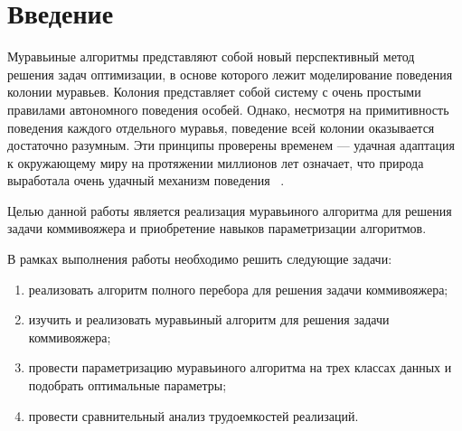 \chapter*{Введение}

Муравьиные алгоритмы представляют собой новый перспективный метод решения задач оптимизации, в основе которого лежит моделирование поведения колонии муравьев. Колония представляет собой систему с очень простыми правилами автономного поведения особей. Однако, несмотря на примитивность поведения каждого отдельного муравья, поведение всей колонии оказывается достаточно разумным. Эти принципы проверены временем — удачная адаптация к окружающему миру на протяжении миллионов лет означает, что природа выработала очень удачный механизм поведения ~\cite{first_article}. 


Целью данной работы является реализация муравьиного алгоритма для решения задачи коммивояжера и приобретение навыков параметризации алгоритмов.


В рамках выполнения работы необходимо решить следующие задачи: 
\begin{enumerate}[label={\arabic*)}]
	\item реализовать алгоритм полного перебора для решения задачи коммивояжера;
	\item изучить и реализовать муравьиный алгоритм для решения задачи коммивояжера;
	\item провести параметризацию муравьиного алгоритма на трех классах данных и подобрать оптимальные параметры;
	\item провести сравнительный анализ трудоемкостей реализаций.
\end{enumerate}
